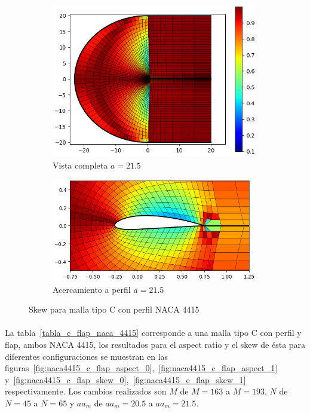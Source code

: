 \documentclass[letterpaper, openright, 12pt]{book}
\begin{document}
\begin{figure}[htbp!]
\begin{subfigure}[c]{0.48\textwidth}
            \includegraphics[keepaspectratio, width=0.99\textwidth]
                {./img/naca4415_c_aa_215_skew_far}
            \caption{Vista completa $a = 21.5$}
            \label{fig:naca4415_c_aa_215_skew_far}
        \end{subfigure}
        \hfill
        \begin{subfigure}[c]{0.48\textwidth}
            \includegraphics[keepaspectratio, width=0.99\textwidth]
                {./img/naca4415_c_aa_215_skew_close}
            \caption{Acercamiento a perfil $a = 21.5$}
            \label{fig:naca4415_c_aa_215_skew_close}
        \end{subfigure}
        \caption{Skew para malla tipo C con perfil NACA 4415}
        \label{fig:naca4415_c_skew_1}
    \end{figure}

    \paragraph*{}
    La tabla~\ref{tabla_c_flap_naca_4415} corresponde a una malla tipo C con
    perfil y flap, ambos NACA 4415, los resultados para el aspect ratio y el
    skew de ésta para diferentes configuraciones se muestran en las
    figuras~\ref{fig:naca4415_c_flap_aspect_0},~\ref{fig:naca4415_c_flap_aspect_1}
    y~\ref{fig:naca4415_c_flap_skew_0},~\ref{fig:naca4415_c_flap_skew_1}
    respectivamente. Los cambios realizados son $M$ de $M=163$ a $M=193$, $N$
    de $N=45$ a $N=65$ y $aa_{m}$ de $aa_{m} = 20.5$ a $aa_{m}=21.5$.
\end{document}

